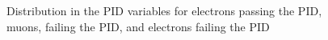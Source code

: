 \begin{figure}
   {
    \label{fig:electrons_failing_pid}
    Distribution in the PID variables for electrons passing the PID, muons, failing the PID, and electrons failing the PID
  }
\end{figure}
